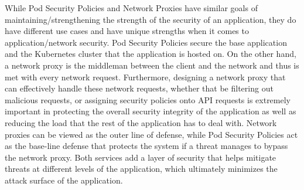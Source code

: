 While Pod Security Policies and Network Proxies have similar goals of maintaining/strengthening 
the strength of the security of an application, they do have different use cases and have unique 
strengths when it comes to application/network security. Pod Security Policies secure the base 
application and the Kubernetes cluster that the application is hosted on. On the other hand, a 
network proxy is the middleman between the client and the network and thus is met with every network 
request. Furthermore, designing a network proxy that can effectively handle these network requests, 
whether that be filtering out malicious requests, or assigning security policies onto API requests 
is extremely important in protecting the overall security integrity of the application as well as 
reducing the load that the rest of the application has to deal with. Network proxies can be viewed 
as the outer line of defense, while Pod Security Policies act as the base-line defense that protects 
the system if a threat manages to bypass the network proxy. Both services add a layer of security 
that helps mitigate threats at different levels of the application, which ultimately minimizes the 
attack surface of the application.

